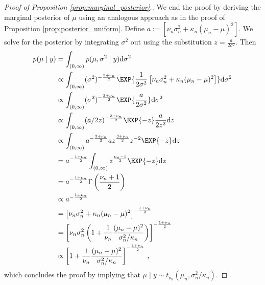 \begin{proof}[Proof of Proposition \ref{prop:marginal_posterior}.]
We end the proof by deriving the marginal posterior of $\mu$ using an analogous approach as in the proof of Proposition \ref{prop:posterior_uniform}.
Define $a := \left[\nu_n\sigma_n^2 + \kappa_n(\mu_n - \mu)^2 \right]$. We solve for the posterior by integrating $\sigma^2$ out using the substitution $z = \frac{a}{2\sigma^2}$. Then
\begin{align*}
  p(\mu \mid y) &= \int_{(0, \infty)} p(\mu, \sigma^2 \mid y) \mathrm{d}\sigma^2\\
  &\propto \int_{(0, \infty)}(\sigma^2)^{-\frac{3 + \nu_n}{2}} \EXP{\frac{1}{2\sigma^2} \left[\nu_n \sigma_n^2 + \kappa_n(\mu_n - \mu)^2 \right]}\mathrm{d}\sigma^2\\
  &\propto \int_{(0, \infty)}(\sigma^2)^{-\frac{3 + \nu_n}{2}} \EXP{\frac{a}{2\sigma^2}}\mathrm{d}\sigma^2\\
  &\propto \int_{(0, \infty)}(a / 2z)^{-\frac{3 + \nu_n}{2}} \EXP{-z} \frac{a}{2 z^2} \mathrm{d}z\\
  &\propto \int_{(0, \infty)}a^{-\frac{3 + \nu_n}{2}}a z^{\frac{3 + \nu_n}{2}}z^{-2} \EXP{-z} \mathrm{d}z\\
  &= a^{-\frac{1 + \nu_n}{2}} \int_{(0, \infty)} z^{\frac{\nu_n - 1}{2}} \EXP{-z} \mathrm{d}z\\
  &= a^{-\frac{1 + \nu_n}{2}} \Gamma\left(\frac{\nu_n + 1}{2}\right)\\
  &\propto a^{-\frac{1 + \nu_n}{2}}\\
  &= \left[\nu_n \sigma_n^2 + \kappa_n(\mu_n - \mu)^2 \right]^{-\frac{1 + \nu_n}{2}}\\
  &= \left[\nu_n \sigma_n^2\left(1 + \frac{1}{\nu_n}\frac{(\mu_n - \mu)^2}{\sigma_n^2 / \kappa_n}\right) \right]^{-\frac{1 + \nu_n}{2}}\\
  &\propto \left[1 + \frac{1}{\nu_n}\frac{(\mu_n - \mu)^2}{\sigma_n^2 / \kappa_n} \right]^{-\frac{1 + \nu_n}{2}} \,,
\end{align*}
which concludes the proof by implying that $\mu \mid y \sim t_{\nu_n}(\mu_n, \sigma_n^2 / \kappa_n)$.
\end{proof}

